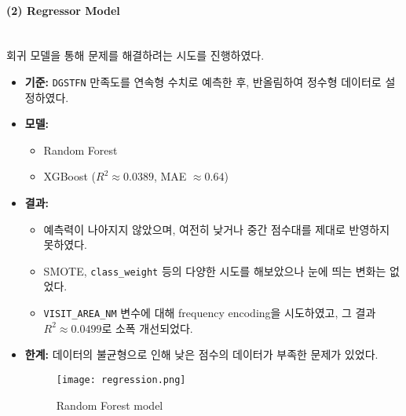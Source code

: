 \documentclass[sigconf]{acmart}
\begin{document}
\begin{CJK}{UTF8}{mj}
\paragraph{(2) Regressor Model}\mbox{}\\
회귀 모델을 통해 문제를 해결하려는 시도를 진행하였다.
\begin{itemize}
  \item \textbf{기준:} \texttt{DGSTFN} 만족도를 연속형 수치로 예측한 후, 반올림하여 정수형 데이터로 설정하였다.
  \item \textbf{모델:}
  \begin{itemize}
    \item Random Forest
    \item XGBoost ($R^2 \approx 0.0389$, MAE $\approx 0.64$)
  \end{itemize}
  \item \textbf{결과:}
  \begin{itemize}
    \item 예측력이 나아지지 않았으며, 여전히 낮거나 중간 점수대를 제대로 반영하지 못하였다.
    \item SMOTE, \texttt{class\_weight} 등의 다양한 시도를 해보았으나 눈에 띄는 변화는 없었다.
    \item \texttt{VISIT\_AREA\_NM} 변수에 대해 frequency encoding을 시도하였고, 그 결과 $R^2 \approx 0.0499$로 소폭 개선되었다.
  \end{itemize}
  \item \textbf{한계:} 데이터의 불균형으로 인해 낮은 점수의 데이터가 부족한 문제가 있었다.
      \begin{figure}[H]
      \centering
      \texttt{[image: regression.png]}
      \caption{Random Forest model}
      \label{fig:regressor}
      \end{figure}
\end{itemize}


\end{CJK}
\end{document}
